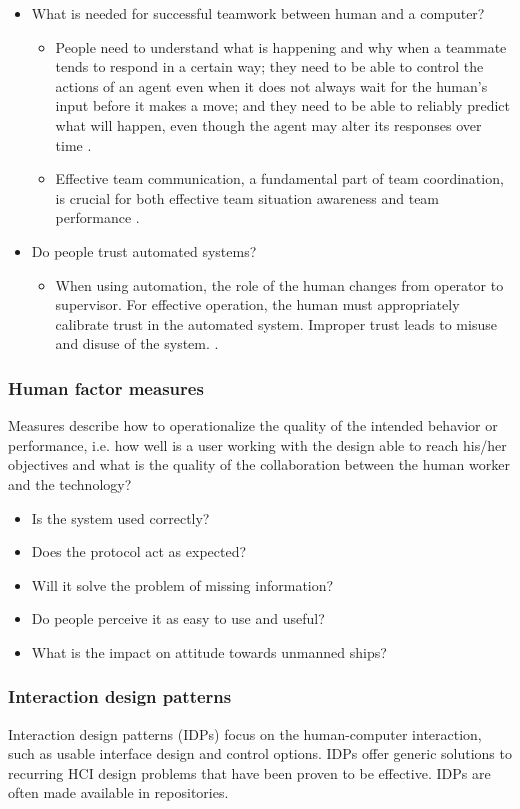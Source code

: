 \begin{itemize}
	\item What is needed for successful teamwork between human and a computer?
	\begin{itemize}
		\item  People need to understand what is happening and why when a teammate tends to respond in a certain way; they need to be able to control the actions of an agent even when it does not always wait for the human’s input before it makes a move; and they need to be able to reliably predict what will happen, even though the agent may alter its responses over time \cite{Bradshaw2003}.
		\item Effective team communication, a fundamental part of team coordination, is crucial for both effective team situation awareness and team performance \cite{Demir2017}.
	\end{itemize}
	
	\item Do people trust automated systems?
	\begin{itemize}
		\item When using automation, the role of the human changes from operator to supervisor. For effective operation, the human must appropriately calibrate trust in the automated system. Improper trust leads to misuse and disuse of the system. \cite{Walliser2011}.
	\end{itemize}
\end{itemize}

\subsubsection{Human factor measures}
Measures describe how to operationalize the quality of the intended behavior or performance, i.e. how well is a user working with the design able to reach his/her objectives and what is the quality of the collaboration between the human worker and the technology?
\begin{itemize}
	\item Is the system used correctly?
	\item Does the protocol act as expected?
	\item Will it solve the problem of missing information?
	\item Do people perceive it as easy to use and useful?
	\item What is the impact on attitude towards unmanned ships?
\end{itemize}

\subsubsection{Interaction design patterns}
Interaction design patterns (IDPs) focus on the human-computer interaction, such as usable interface design and control options. IDPs offer generic solutions to recurring HCI design problems that have been proven to be effective. IDPs are often made available in repositories.

